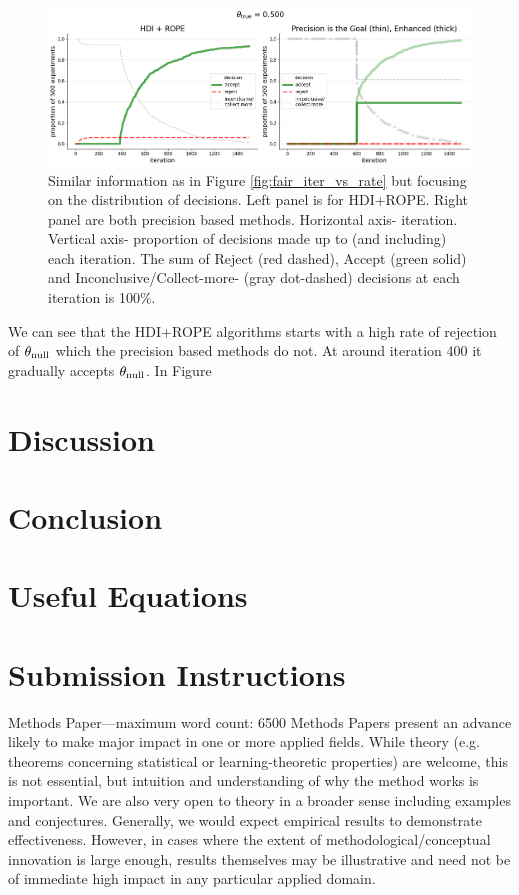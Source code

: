 \documentclass{article}
\begin{document}
\begin{figure}[h!]
  \centering
  \includegraphics[width=1\textwidth]{fair_experiment_decision_rates.png}
  \caption{Similar information as in Figure \ref{fig:fair_iter_vs_rate} but focusing on the distribution of decisions. Left panel is for HDI+ROPE. Right panel are both precision based methods. Horizontal axis- iteration. Vertical axis- proportion of decisions made up to (and including) each iteration. The sum of Reject (red dashed), Accept (green solid) and Inconclusive/Collect-more- (gray dot-dashed) decisions at each iteration is 100\%.
  }
  \label{fig:fair_decisions}
\end{figure}

We can see that the HDI+ROPE algorithms starts with a high rate of rejection of
$\theta_{\rm null}$ which the precision based methods do not. At around iteration 400
it gradually accepts $\theta_{\rm null}$. In Figure 




\section{Discussion}

\section{Conclusion}

\section{Useful Equations}


\section{Submission Instructions}

Methods Paper—maximum word count: 6500
Methods Papers present an advance likely to make major impact in one or more applied
fields. While theory (e.g. theorems concerning statistical or
learning-theoretic properties) are welcome, this is not essential, but intuition and
understanding of why the method works is important.
We are also very open to theory in a broader sense including examples and conjectures.
Generally, we would expect empirical results to demonstrate effectiveness.
However, in cases where the extent of methodological/conceptual innovation is large
enough, results themselves may be illustrative and need not be of immediate high impact
in any particular applied domain.
\end{document}
